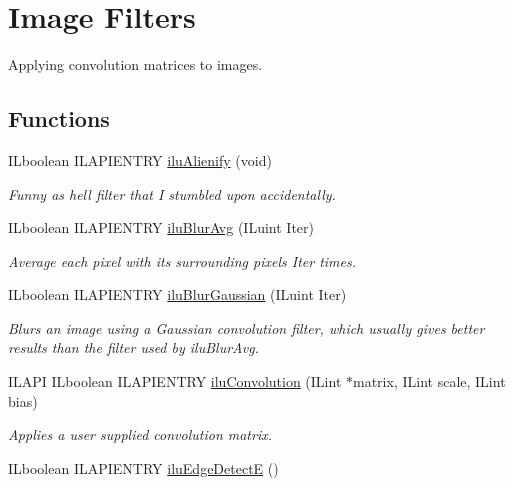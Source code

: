 \hypertarget{group__ilu__filter}{\section{Image Filters}
\label{group__ilu__filter}
}


Applying convolution matrices to images.  


\subsection*{Functions}
\begin{DoxyCompactItemize}
\item 
I\-Lboolean I\-L\-A\-P\-I\-E\-N\-T\-R\-Y \hyperlink{group__ilu__filter_gacb6e1a0e8dc10748f1cfbf60b1f8c350}{ilu\-Alienify} (void)
\begin{DoxyCompactList}\small\item\em Funny as hell filter that I stumbled upon accidentally. \end{DoxyCompactList}\item 
I\-Lboolean I\-L\-A\-P\-I\-E\-N\-T\-R\-Y \hyperlink{group__ilu__filter_ga017478330f243e5bb6e6edc29cdf1f37}{ilu\-Blur\-Avg} (I\-Luint Iter)
\begin{DoxyCompactList}\small\item\em Average each pixel with its surrounding pixels {\itshape Iter} times. \end{DoxyCompactList}\item 
I\-Lboolean I\-L\-A\-P\-I\-E\-N\-T\-R\-Y \hyperlink{group__ilu__filter_ga4163c484488b3afc352e3ed6c768babf}{ilu\-Blur\-Gaussian} (I\-Luint Iter)
\begin{DoxyCompactList}\small\item\em Blurs an image using a Gaussian convolution filter, which usually gives better results than the filter used by ilu\-Blur\-Avg. \end{DoxyCompactList}\item 
I\-L\-A\-P\-I I\-Lboolean I\-L\-A\-P\-I\-E\-N\-T\-R\-Y \hyperlink{group__ilu__filter_gaeb5bb85ceb172bd9742f7f0730a1d440}{ilu\-Convolution} (I\-Lint $\ast$matrix, I\-Lint scale, I\-Lint bias)
\begin{DoxyCompactList}\small\item\em Applies a user supplied convolution matrix. \end{DoxyCompactList}\item 
I\-Lboolean I\-L\-A\-P\-I\-E\-N\-T\-R\-Y \hyperlink{group__ilu__filter_gafbd320c463d5e8a45e68d0edb3973597}{ilu\-Edge\-Detect\-E} ()

\end{DoxyCompactItemize}
